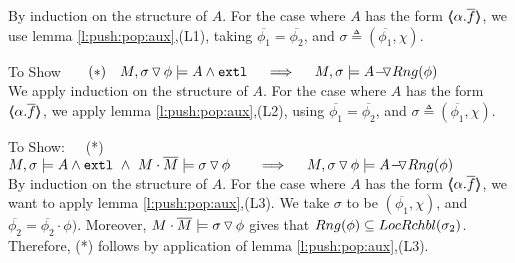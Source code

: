  By  induction on the structure of $A$. For the case where $A$ has the form $\inside {\alpha.\overline f}$, we use lemma \ref{l:push:pop:aux},(L1), taking $\overline {\phi_1} = \overline { \phi_2}$, and $\sigma \triangleq (\overline {\phi_1},\chi).$
\\
\completeProofSub
 

\vspace{1cm}

$~$ \\
To Show \ \ \  $(*)\ \ \  M,  \PushSLong {\phi} {\sigma}   \models  A  \wedge \extThis    \ \  \ \  \Longrightarrow  \ \ \ \ M, \sigma \models \PushASLong  {Rng(\phi)} {A}$ 
\\
$~$ \\
We apply induction on the structure of $A$. For the case where $A$ has the form $\inside {\alpha.\overline f}$, we apply lemma \ref{l:push:pop:aux},(L2), using    $\overline {\phi_1} = \overline { \phi_2}$, and $\sigma \triangleq (\overline {\phi_1},\chi).$

\completeProofSub

\vspace{1cm}
$~$ \\
To Show:\ \ \   (*) \ \  $M, \sigma  \models  A  \wedge \extThis  \ \wedge \ M\cdot\Mtwo \models \PushSLong {\phi} {\sigma}   \ \  \ \ \  \  \Longrightarrow  \ \ \ \ M, \PushSLong {\phi} {\sigma} \models \PushASLong  {Rng(\phi)} {A}$
\\ 
$~$ \\
By induction on the structure of $A$. 
 For the case where $A$ has the form $\inside {\alpha.\overline f}$, we want to apply lemma \ref{l:push:pop:aux},(L3). We take  $\sigma$ to be $ (\overline {\phi_1}, \chi)$, and $\overline {\phi_2}=\overline {\phi_2}\cdot \phi)$. Moreover,  $M\cdot\Mtwo \models \PushSLong {\phi} {\sigma}$ gives  that $Rng(\phi)\subseteq \LRelevantO {\sigma_2}$. Therefore, (*) follows by application of lemma \ref{l:push:pop:aux},(L3).
\completeProofSub